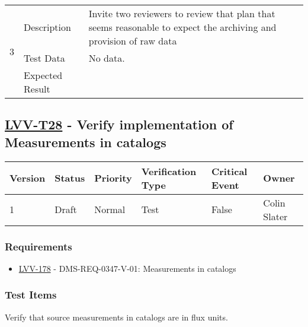 \begin{longtable}[]{p{1.3cm}p{2cm}p{13cm}}
            \multirow{3}{*}{ 3 } & Description &
            \begin{minipage}[t]{13cm}{\footnotesize
            {Invite two reviewers to review that plan that seems reasonable to
expect the archiving and provision of raw data}

            \vspace{\dp0}
            } \end{minipage} \\ \cline{2-3}
            & Test Data &
            \begin{minipage}[t]{13cm}{\footnotesize
                No data.
                \vspace{\dp0}
            } \end{minipage} \\ \cline{2-3}
            & Expected Result &
        \\ \midrule
    \end{longtable}

\subsection{\href{https://jira.lsstcorp.org/secure/Tests.jspa\#/testCase/LVV-T28}{LVV-T28}
    - Verify implementation of Measurements in catalogs}\label{lvv-t28}

\begin{longtable}[]{llllll}
\toprule
Version & Status & Priority & Verification Type & Critical Event & Owner
\\\midrule
1 & Draft & Normal &
Test & False & Colin Slater
\\\bottomrule
\end{longtable}

\subsubsection{Requirements}
\begin{itemize}
\item \href{https://jira.lsstcorp.org/browse/LVV-178}{LVV-178} - DMS-REQ-0347-V-01: Measurements in catalogs
\end{itemize}

\subsubsection{Test Items}
Verify that source measurements in catalogs are in flux units.



